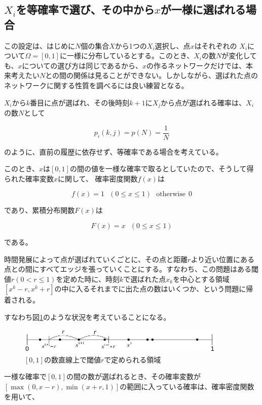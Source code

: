 \subsection{$X_{i}$を等確率で選び、その中から$x$が一様に選ばれる場合}

この設定は、はじめに$N$個の集合$X$から1つの$X_{i}$選択し、点$x$はそれぞれの $X_{i}$について$\Omega = [0,1]$に一様に分布しているとする。このとき、$X_{i}$の数$N$が変化しても、$x$についての選び方は同じであるから、$x$の作るネットワークだけでは、本来考えたい$N$との間の関係は見ることができない。しかしながら、選ばれた点のネットワークに関する性質を調べるには良い練習となる。

$X_{i}$から$k$番目に点が選ばれ、その後時刻$k+1$に$X_{j}$から点が選ばれる確率は、$X_{i}$の数$N$として

$$p_{i}(k,j) = p(N) = \frac{1}{N}$$

のように、直前の履歴に依存せず、等確率である場合を考えている。

このとき、$x$は$[0,1]$の間の値を一様な確率で取るとしていたので、そうして得られた確率変数$x$に関して、
確率密度関数$f(x)$は

$$f(x) = 1\ \ \ (0\le x \le 1)\ \ \ \text{otherwise}\ \ 0$$

であり、累積分布関数$F(x)$は

$$F(x) = x\ \ \ (0\le x \le 1)$$

である。

時間発展によって点が選ばれていくごとに、その点と距離$r$より近い位置にある点との間にすべてエッジを張っていくことにする。すなわち、この問題はある閾値$r(0<r\le1)$を定めた時に、時刻$k$で選ばれた点$x_{k}$を中心とする領域$[x^{k}-r, x^{k}+r]$の中に入るそれまでに出た点の数はいくつか、という問題に帰着される。

すなわち図\ref{fig:f2}のような状況を考えていることになる。

\begin{figure}[H]
    \begin{center}
        \includegraphics[width=10cm]{../simple1/simple001_1.jpg}
        \caption{$[0,1]$の数直線上で閾値$r$で定められる領域}
        \label{fig:f2}
    \end{center}
\end{figure}

一様な確率で$[0,1]$の間の数が選ばれるとき、その確率変数が$[\max(0,x-r), \min(x+r,1)]$の範囲に入っている確率は、確率密度関数を用いて、


